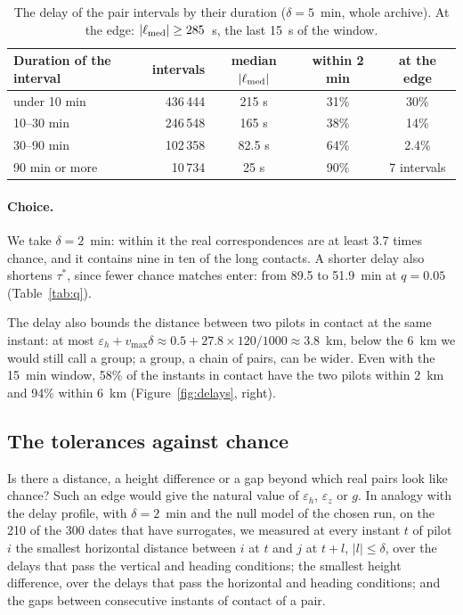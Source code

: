 \begin{table}
\centering
\small
\begin{tabular}{@{}l r c c c@{}}
\toprule
Duration of the interval & intervals & median $|\ell_{\rm med}|$ & within 2 min & at the edge \\
\midrule
under 10 min & 436\,444 & 215 s & 31\% & 30\% \\
10--30 min & 246\,548 & 165 s & 38\% & 14\% \\
30--90 min & 102\,358 & 82.5 s & 64\% & 2.4\% \\
90 min or more & 10\,734 & 25 s & 90\% & 7 intervals \\
\bottomrule
\end{tabular}
\caption{The delay of the pair intervals by their duration ($\delta=5$~min, whole archive). At
the edge: $|\ell_{\rm med}|\ge285$~s, the last 15~s of the window.}
\label{tab:ell}
\end{table}

\paragraph{Choice.} We take $\delta=2$~min: within it the real correspondences are at least 3.7
times chance, and it contains nine in ten of the long contacts. A shorter delay also shortens
$\tau^*$, since fewer chance matches enter: from 89.5 to 51.9~min at $q=0.05$ (Table~\ref{tab:q}).

The delay also bounds the distance between two pilots in contact at the same instant: at most
$\varepsilon_h+v_{\max}\delta\approx0.5+27.8\times120/1000\approx3.8$~km, below the 6~km we would
still call a group; a group, a chain of pairs, can be wider. Even with the 15~min window, 58\% of
the instants in contact have the two pilots within 2~km and 94\% within 6~km
(Figure~\ref{fig:delays}, right).

\subsection{The tolerances against chance}\label{sec:tolerances}

Is there a distance, a height difference or a gap beyond which real pairs look like chance? Such
an edge would give the natural value of $\varepsilon_h$, $\varepsilon_z$ or $g$. In analogy with
the delay profile, with $\delta=2$~min and the null model of the chosen run, on the 210 of the 300
dates that have surrogates, we measured at every instant $t$ of pilot $i$ the smallest horizontal
distance between $i$ at $t$ and $j$ at $t+l$, $|l|\le\delta$, over the delays that pass the
vertical and heading conditions; the smallest height difference, over the delays that pass the
horizontal and heading conditions; and the gaps between consecutive instants of contact of a
pair.


